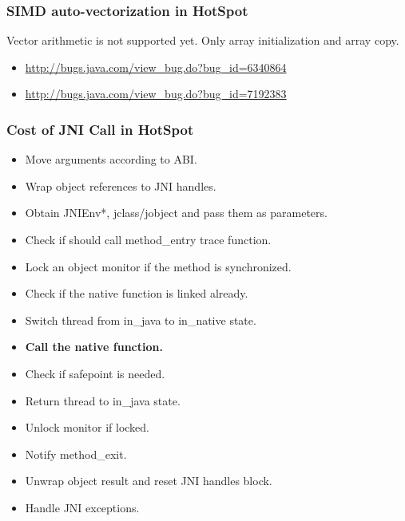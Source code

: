 \documentclass{beamer}
\begin{document}
  	\begin{frame}
  		\frametitle{SIMD auto-vectorization in HotSpot}
		Vector arithmetic is not supported yet. Only array initialization and array copy.
  		\begin{itemize}
  			\item \url{http://bugs.java.com/view_bug.do?bug_id=6340864}
  			\item \url{http://bugs.java.com/view_bug.do?bug_id=7192383}
  		\end{itemize}
  	\end{frame}
  	\begin{frame}
  		\frametitle{Cost of JNI Call	in HotSpot}
  		\begin{itemize}
  			\item Move arguments according to ABI.
  			\item Wrap object references to JNI handles.
  			\item Obtain JNIEnv*, jclass/jobject and pass them as parameters.
  			\item Check if should call method\_entry trace function.
  			\item Lock an object monitor if the method is synchronized.
  			\item Check if the native function is linked already.%
  			\item Switch thread from in\_java to in\_native state.
  			\item \textbf{Call the native function.}
  			\item Check if safepoint is needed.
  			\item Return thread to in\_java state.
  			\item Unlock monitor if locked.
  			\item Notify method\_exit.
  			\item Unwrap object result and reset JNI handles block.
  			\item Handle JNI exceptions.
  		\end{itemize}
  	\end{frame}
\end{document}
